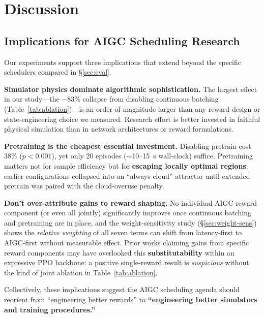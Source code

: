 \section{Discussion}
\label{sec:discuss}

\subsection{Implications for AIGC Scheduling Research}
\label{sec:implications}

Our experiments support three implications that extend beyond
the specific schedulers compared in \S\ref{sec:eval}.

\textbf{Simulator physics dominate algorithmic sophistication.}
The largest effect in our study---the
$-83\%$ \slo{} collapse from disabling continuous batching
(Table~\ref{tab:ablation})---is an order of magnitude larger
than any reward-design or state-engineering choice we
measured. Research effort is better invested in faithful
physical simulation than in network architectures or reward
formulations.

\textbf{Pretraining is the cheapest essential investment.}
Disabling pretrain cost $38\%$ \slo{} ($p<0.001$), yet only
$20$ episodes ($\sim$10--15~s wall-clock) suffice. Pretraining
matters not for sample efficiency but for \textbf{escaping
locally optimal regions}: earlier configurations collapsed
into an ``always-cloud'' attractor until extended pretrain was
paired with the cloud-overuse penalty.

\textbf{Don't over-attribute gains to reward shaping.} No
individual AIGC reward component (or even all jointly)
significantly improves
\slo{} once continuous batching and pretraining are in place,
and the weight-sensitivity study (\S\ref{sec:weight-sens})
shows the \emph{relative weighting} of all seven terms can
shift from latency-first to AIGC-first without measurable
effect. Prior works claiming gains from specific reward
components may have overlooked this
\textbf{substitutability} within an expressive PPO backbone:
a positive single-reward result is \emph{suspicious} without
the kind of joint ablation in Table~\ref{tab:ablation}.

Collectively, these implications suggest the AIGC scheduling
agenda should reorient from ``engineering better rewards'' to
\textbf{``engineering better simulators and training
procedures.''}

